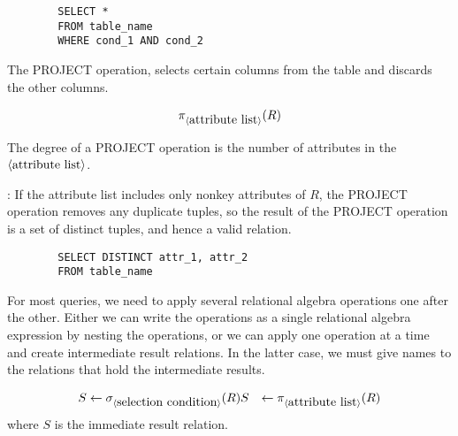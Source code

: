       \begin{lstlisting}
        SELECT *
        FROM table_name
        WHERE cond_1 AND cond_2
      \end{lstlisting}


      \par The PROJECT operation, selects certain columns from the table and discards the other columns.

      \begin{align*}
        \pi_{\langle \mbox{attribute list} \rangle}(R)
      \end{align*}

      \par The degree of a PROJECT operation is the number of attributes in the $\langle \mbox{attribute list} \rangle$.

      \par {}: If the attribute list includes only nonkey attributes of $R$, the PROJECT operation removes any duplicate tuples, so the result of the PROJECT operation is a set of distinct tuples, and hence a valid relation.


      \begin{lstlisting}
        SELECT DISTINCT attr_1, attr_2
        FROM table_name
      \end{lstlisting}

      \par For most queries, we need to apply several relational algebra operations one after the other. Either we can write the operations as a single relational algebra expression by nesting the operations, or we can apply one operation at a time and create intermediate result relations. In the latter case, we must give names to the relations that hold the intermediate results.

      \par {}
    \begin{align*}
      S &\leftarrow \sigma_{\langle \mbox{selection condition} \rangle}(R)
      S &\leftarrow \pi_{\langle \mbox{attribute list} \rangle}(R) \\
    \end{align*}
    where $S$ is the immediate result relation.


